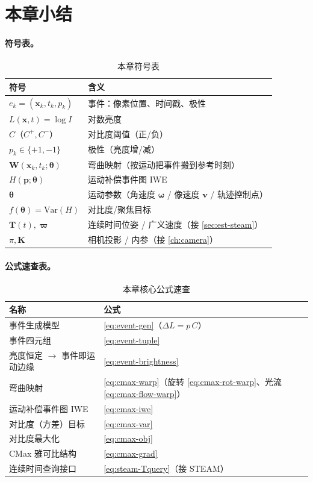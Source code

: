\section*{本章小结}

\paragraph{符号表。}
\begin{table}[H]\centering\small
\caption{本章符号表}
\begin{tabular}{ll}
\toprule
符号 & 含义 \\
\midrule
$e_k=(\mathbf x_k,t_k,p_k)$ & 事件：像素位置、时间戳、极性 \\
$L(\mathbf x,t)=\log I$ & 对数亮度 \\
$C$（$C^+,C^-$）& 对比度阈值（正/负） \\
$p_k\in\{+1,-1\}$ & 极性（亮度增/减） \\
$\mathbf W(\mathbf x_k,t_k;\boldsymbol\theta)$ & 弯曲映射（按运动把事件搬到参考时刻） \\
$H(\mathbf p;\boldsymbol\theta)$ & 运动补偿事件图 IWE \\
$\boldsymbol\theta$ & 运动参数（角速度 $\boldsymbol\omega$ / 像速度 $\mathbf v$ / 轨迹控制点） \\
$f(\boldsymbol\theta)=\mathrm{Var}(H)$ & 对比度/聚焦目标 \\
$\mathbf T(t),\boldsymbol\varpi$ & 连续时间位姿 / 广义速度（接 \cref{sec:est-steam}） \\
$\pi,\mathbf K$ & 相机投影 / 内参（接 \cref{ch:camera}） \\
\bottomrule
\end{tabular}
\end{table}

\paragraph{公式速查表。}
\begin{table}[H]\centering\small
\caption{本章核心公式速查}
\begin{tabular}{ll}
\toprule
名称 & 公式 \\
\midrule
事件生成模型 & \cref{eq:event-gen}（$\Delta L=p\,C$）\\
事件四元组 & \cref{eq:event-tuple} \\
亮度恒定 $\to$ 事件即运动边缘 & \cref{eq:event-brightness} \\
弯曲映射 & \cref{eq:cmax-warp}（旋转 \cref{eq:cmax-rot-warp}、光流 \cref{eq:cmax-flow-warp}）\\
运动补偿事件图 IWE & \cref{eq:cmax-iwe} \\
对比度（方差）目标 & \cref{eq:cmax-var} \\
对比度最大化 & \cref{eq:cmax-obj} \\
CMax 雅可比结构 & \cref{eq:cmax-grad} \\
连续时间查询接口 & \cref{eq:steam-Tquery}（接 STEAM）\\
\bottomrule
\end{tabular}
\end{table}

